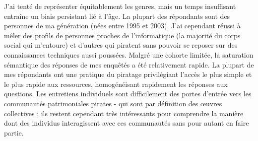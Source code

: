 J'ai tenté de représenter équitablement les genres, mais un temps insuffisant entraîne un biais persistant lié à l'âge. La plupart des répondants sont des personnes de ma génération (nées entre 1995 et 2003). J'ai cependant réussi à mêler des profils de personnes proches de l'informatique (la majorité du corps social qui m'entoure) et d'autres qui piratent sans pouvoir se reposer sur des connaissances techniques aussi poussées. 
Malgré une cohorte limitée, la saturation sémantique des réponses de mes enquêtés a été relativement rapide. La plupart de mes répondants ont une pratique du piratage privilégiant l'accès le plus simple et le plus rapide aux ressources, homogénéisant rapidement les réponses aux questions. Les entretiens individuels sont difficilement des portes d'entrée vers les communautés patrimoniales pirates - qui sont par définition des œuvres collectives ; ils restent cependant très intéressants pour comprendre la manière dont des individus interagissent avec ces communautés sans pour autant en faire partie.

